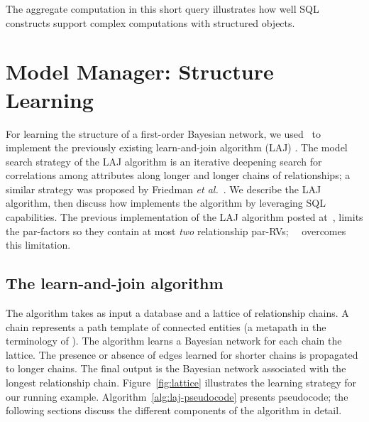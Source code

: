 The aggregate computation in this short query illustrates how well SQL constructs support complex computations with structured objects. 

%



\section{Model Manager: Structure Learning}

For learning the structure of a first-order Bayesian network, we used \FB\ to implement the previously existing learn-and-join algorithm (LAJ) \cite{Khosravi2010,Schulte2012}. 
The model search strategy of the LAJ algorithm is an iterative deepening search for correlations among attributes along longer and longer chains of relationships; a similar strategy was proposed by Friedman {\em et al.}~\cite{friedman99prm}.
We describe the LAJ algorithm, then discuss how \FB implements the algorithm by leveraging SQL capabilities. The previous implementation of the LAJ algorithm posted at~\cite{bib:bbsite}, limits the par-factors so they contain at most {\em two} relationship par-RVs; ~\FB\ overcomes this limitation.

\subsection{The learn-and-join algorithm}
The algorithm takes as input a database and a lattice of relationship chains. A chain represents a path template of connected entities (a metapath in the terminology of \cite{Sun2012}). The algorithm learns a Bayesian network for each chain the lattice. The presence or absence of edges learned for shorter chains is propagated to longer chains. The final output is the Bayesian network associated with the longest relationship chain. Figure~\ref{fig:lattice} illustrates the learning strategy for our running example. Algorithm~\ref{alg:laj-pseudocode} presents pseudocode; the following sections discuss the different components of the algorithm in detail.


